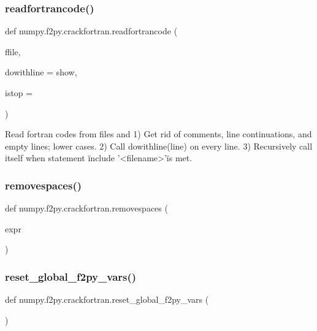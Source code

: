 \subsubsection{\texorpdfstring{readfortrancode()}{readfortrancode()}}
{\footnotesize\ttfamily def numpy.\+f2py.\+crackfortran.\+readfortrancode (\begin{DoxyParamCaption}\item[{}]{ffile,  }\item[{}]{dowithline = {\ttfamily show},  }\item[{}]{istop = {} }\end{DoxyParamCaption})}

\begin{DoxyVerb}Read fortran codes from files and
 1) Get rid of comments, line continuations, and empty lines; lower cases.
 2) Call dowithline(line) on every line.
 3) Recursively call itself when statement \"include '<filename>'\" is met.
\end{DoxyVerb}
 \mbox{\label{namespacenumpy_1_1f2py_1_1crackfortran_a2e8aeb0ccd9778569ea551554825c0be}} 
\subsubsection{\texorpdfstring{removespaces()}{removespaces()}}
{\footnotesize\ttfamily def numpy.\+f2py.\+crackfortran.\+removespaces (\begin{DoxyParamCaption}\item[{}]{expr }\end{DoxyParamCaption})}

\mbox{\label{namespacenumpy_1_1f2py_1_1crackfortran_a33135ace878a349b007af87808e8f2fa}} 
\subsubsection{\texorpdfstring{reset\+\_\+global\+\_\+f2py\+\_\+vars()}{reset\_global\_f2py\_vars()}}
{\footnotesize\ttfamily def numpy.\+f2py.\+crackfortran.\+reset\+\_\+global\+\_\+f2py\+\_\+vars (\begin{DoxyParamCaption}{ }\end{DoxyParamCaption})}

